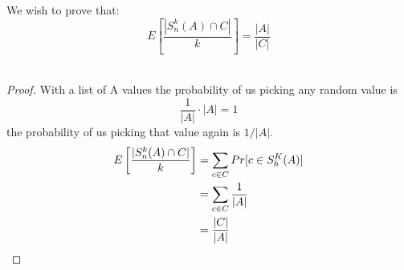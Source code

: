 We wish to prove that:
\begin{equation*}
    E\left[ \frac{|S^{k}_{n}(A) \cap C |}{k}\right] = \frac{|A|}{|C|}
\end{equation*}\\
\begin{proof}
With a list of A values the probability of us picking any random value is
\begin{equation*}
    \frac{1}{|A|} \cdot |A| = 1
\end{equation*}
the probability of us picking that value again is $1/|A|$.
\begin{align*}
    E\left[ \frac{|S^{k}_{n}(A) \cap C |}{k}\right] &= \sum\limits_{c \in C}Pr[c \in S^{K}_{h}(A)]\\
    &= \sum\limits_{c \in C} \frac{1}{|A|}\\
    &= \frac{|C|}{|A|}\qedhere
\end{align*}
\end{proof}
